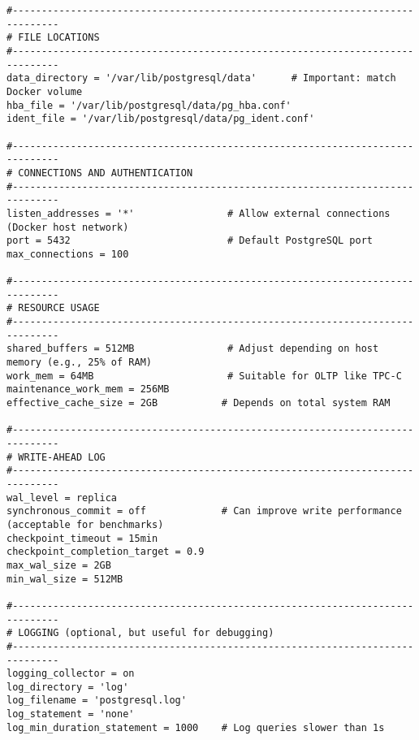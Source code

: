 \begin{lstlisting}[caption={PostgreSQL configuration file}, label={lst:postgresql-config}]
#------------------------------------------------------------------------------
# FILE LOCATIONS
#------------------------------------------------------------------------------
data_directory = '/var/lib/postgresql/data'      # Important: match Docker volume
hba_file = '/var/lib/postgresql/data/pg_hba.conf'
ident_file = '/var/lib/postgresql/data/pg_ident.conf'

#------------------------------------------------------------------------------
# CONNECTIONS AND AUTHENTICATION
#------------------------------------------------------------------------------
listen_addresses = '*'                # Allow external connections (Docker host network)
port = 5432                           # Default PostgreSQL port
max_connections = 100

#------------------------------------------------------------------------------
# RESOURCE USAGE
#------------------------------------------------------------------------------
shared_buffers = 512MB                # Adjust depending on host memory (e.g., 25% of RAM)
work_mem = 64MB                       # Suitable for OLTP like TPC-C
maintenance_work_mem = 256MB
effective_cache_size = 2GB           # Depends on total system RAM

#------------------------------------------------------------------------------
# WRITE-AHEAD LOG
#------------------------------------------------------------------------------
wal_level = replica
synchronous_commit = off             # Can improve write performance (acceptable for benchmarks)
checkpoint_timeout = 15min
checkpoint_completion_target = 0.9
max_wal_size = 2GB
min_wal_size = 512MB

#------------------------------------------------------------------------------
# LOGGING (optional, but useful for debugging)
#------------------------------------------------------------------------------
logging_collector = on
log_directory = 'log'
log_filename = 'postgresql.log'
log_statement = 'none'
log_min_duration_statement = 1000    # Log queries slower than 1s
\end{lstlisting}


